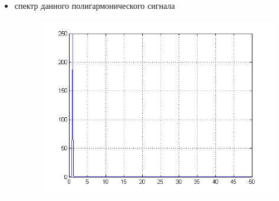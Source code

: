 \documentclass[10pt,a4paper]{article}
\begin{document}
\begin{itemize}
\begin{figure}[h]
\end{figure}
\item спектр данного полигармонического сигнала
\begin{figure}[h]
\centering
\includegraphics[width=12cm]{11.png} 
\end{figure}
\end{itemize}
\FloatBarrier
\end{document}
